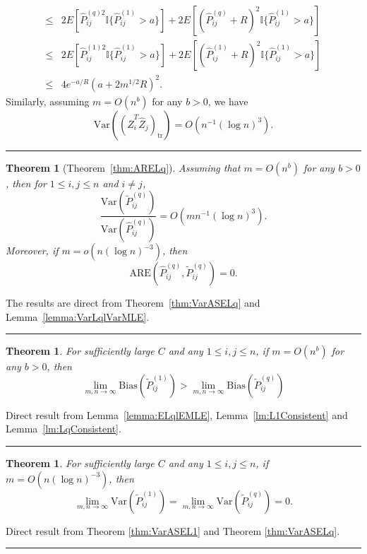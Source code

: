 \documentclass[a4paper]{article}
\newenvironment{proof}{{\bf Proof:  }}{\hfill\rule{2mm}{2mm}}
\newtheorem{theorem}[fact]{Theorem}
\renewcommand{\hat}{\widehat}
\begin{document}
\begin{proof}
\begin{align*}
	\le & 2 E[\hat{P}^{(q)2}_{ij} \mathbb{I}\{\hat{P}^{(1)}_{ij} > a\}] + 2 E[(\hat{P}^{(q)}_{ij} + R)^2 \mathbb{I}\{\hat{P}^{(1)}_{ij} > a\}] \\
	\le & 2 E[\hat{P}^{(1)2}_{ij} \mathbb{I}\{\hat{P}^{(1)}_{ij} > a\}] + 2 E[(\hat{P}^{(1)}_{ij} + R)^2 \mathbb{I}\{\hat{P}^{(1)}_{ij} > a\}] \\
	\le & 4 e^{-a/R} (a + 2 m^{1/2} R)^2.
\end{align*}
Similarly, assuming $m = O(n^b)$ for any $b > 0$, we have
\[
	\mathrm{Var}((\hat{Z}_i^T \hat{Z}_j)_{\mathrm{tr}})
	= O(n^{-1} (\log n)^3).
\]
\end{proof}

\begin{theorem}[Theorem~\ref{thm:ARELq}]
\label{thm:ARELqproof}
Assuming that $m = O(n^b)$ for any $b > 0$,  then for $1 \le i, j \le n$ and $i \ne j$,
\[
	\frac{\mathrm{Var}(\widetilde{P}_{ij}^{(q)})}{\mathrm{Var}(\hat{P}_{ij}^{(q)})}
    = O(m n^{-1} (\log n)^3).
\]
Moreover, if $m = o(n (\log n)^{-3})$, then
\[
	\mathrm{ARE}(\hat{P}_{ij}^{(q)}, \widetilde{P}_{ij}^{(q)}) = 0.
\]
\end{theorem}
\begin{proof}
The results are direct from Theorem~\ref{thm:VarASELq} and Lemma~\ref{lemma:VarLqlVarMLE}.
\end{proof}

\begin{theorem}
\label{thm:biasL1andLq}
For sufficiently large $C$ and any $1 \le i,j \le n$, if $m = O(n^b)$ for any $b > 0$, then
\[
	\lim_{m, n \to \infty} \mathrm{Bias}(\widetilde{P}_{ij}^{(1)})
    > \lim_{m, n \to \infty} \mathrm{Bias}(\widetilde{P}_{ij}^{(q)})
\]
\end{theorem}
\begin{proof}
Direct result from Lemma~\ref{lemma:ELqlEMLE}, Lemma~\ref{lm:L1Consistent} and Lemma~\ref{lm:LqConsistent}.
\end{proof}

\begin{theorem}
\label{thm:varianceL1andLq}
For sufficiently large $C$ and any $1 \le i,j \le n$, if $m = O(n (\log n)^{-3})$, then
\[
	\lim_{m, n \to \infty} \mathrm{Var}(\widetilde{P}_{ij}^{(1)})
    = \lim_{m, n \to \infty} \mathrm{Var}(\widetilde{P}_{ij}^{(q)}) = 0.
\]
\end{theorem}
\begin{proof}
Direct result from Theorem \ref{thm:VarASEL1} and Theorem \ref{thm:VarASELq}.
\end{proof}
\end{document}

